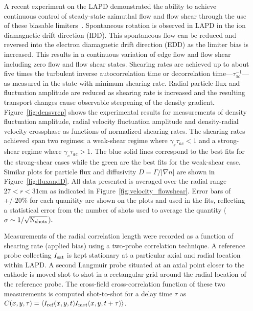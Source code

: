 \documentclass[aip,pop,amsmath,amssymb,peprint,superscriptaddress]{revtex4-1} %
\begin{document}
A recent experiment on the LAPD demonstrated the ability to achieve
continuous control of steady-state azimuthal flow and flow shear
through the use of these biasable
limiters~\cite{schaffner12}. Spontaneous rotation is observed in LAPD
in the ion diamagnetic drift direction (IDD).  This spontaneous flow can be
reduced and reversed into the electron diamagnetic drift direction (EDD) as the
limiter bias is increased. This results in a continuous variation of
edge flow and flow shear including zero flow and flow shear
states. Shearing rates are achieved up to about five times the
turbulent inverse autocorrelation time or decorrelation time---$\tau_{ac}^{-1}$---as measured
in the state with minimum shearing rate. Radial particle flux and
fluctuation amplitude are reduced as shearing rate is increased and
the resulting transport changes cause observable steepening of the
density gradient. Figure~\ref{fig:densvrcp} shows the experimental
results for measurements of density fluctuation amplitude, radial
velocity fluctuation amplitude and density-radial velocity crossphase as functions
of normalized shearing rates. The shearing rates achieved span two
regimes: a weak-shear regime where $\gamma_{s}\tau_{ac} < 1$ and a
strong-shear regime where $\gamma_{s}\tau_{ac} > 1$. The blue solid
lines correspond to the best fits for the strong-shear cases while the
green are the best fits for the weak-shear case.  Similar plots for
particle flux and diffusivity $D = \Gamma/|\nabla n|$ are shown in
Figure~\ref{fig:fluxandD}. All data presented is averaged over the radial range $27 < r < 31$cm as indicated in Figure~\ref{fig:velocity_flowshear}. Error bars of +/-20\% for each quanitity are
shown on the plots and used in the fits, reflecting a statistical
error from the number of shots used to average the quantity ($\sigma
\sim 1/\sqrt{\rm N_{shots}}$). 

Measurements of the radial correlation length were recorded as a function of shearing rate (applied bias) using a two-probe correlation technique. A reference probe collecting $I_{\rm sat}$ is kept stationary at a particular axial and radial location within LAPD. A second Langmuir probe situated at an axial point closer to the cathode is moved shot-to-shot in a rectangular grid around the radial location of the reference probe.  The cross-field cross-correlation function of these two measurements is computed shot-to-shot for a delay time $\tau$ as $C(x,y,\tau) = \langle I_{\rm ref}(x,y,t)I_{\rm mot}(x,y,t+\tau)\rangle$.
\end{document}
